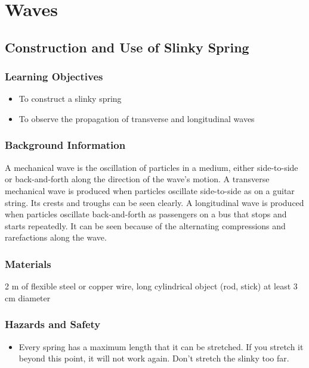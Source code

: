 \section{Waves}

\subsection{Construction and Use of Slinky Spring}

\subsubsection*{Learning Objectives}
\begin{itemize}
\item{To construct a slinky spring} 
\item{To observe the propagation of transverse and longitudinal waves} 
\end{itemize}

\subsubsection*{Background Information}
A mechanical wave is the oscillation of particles in a medium, either side-to-side or back-and-forth along the direction of the wave's motion. A transverse mechanical wave is produced when particles oscillate side-to-side as on a guitar string. Its crests and troughs can be seen clearly. A longitudinal wave is produced when particles oscillate back-and-forth as passengers on a bus that stops and starts repeatedly. It can be seen because of the alternating compressions and rarefactions along the wave.  

\subsubsection*{Materials}
2 m of flexible steel or copper wire, long cylindrical object (rod, stick) at least 3 cm diameter

\subsubsection*{Hazards and Safety}
\begin{itemize}
\item{Every spring has a maximum length that it can be stretched. If you stretch it beyond this point, it will not work again. Don't stretch the slinky too far.} 
\end{itemize}

